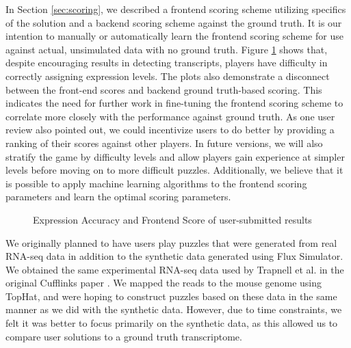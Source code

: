 \documentclass[12pt]{article}
\begin{document}
In Section \ref{sec:scoring}, we described a frontend scoring scheme utilizing specifics of the solution and a backend scoring scheme against the ground truth. It is our intention to manually or automatically learn the frontend scoring scheme for use against actual, unsimulated data with no ground truth. Figure \ref{fig:score} shows that, despite encouraging results in detecting transcripts, players have difficulty in correctly assigning expression levels. The plots also demonstrate a disconnect between the front-end scores and backend ground truth-based scoring. This indicates the need for further work in fine-tuning the frontend scoring scheme to correlate more closely with the performance against ground truth. As one user review also pointed out, we could incentivize users to do better by providing a ranking of their scores against other players. In future versions, we will also stratify the game by difficulty levels and allow players gain experience at simpler levels before moving on to more difficult puzzles. Additionally, we believe that it is possible to apply machine learning algorithms to the frontend scoring parameters and learn the optimal scoring parameters.

\begin{figure}[H]
\centering
{}
\caption{Expression Accuracy and Frontend Score of user-submitted results}\label{fig:score}
\end{figure}

We originally planned to have users play puzzles that were generated from real RNA-seq data in addition to the synthetic data generated using Flux Simulator.
We obtained the same experimental RNA-seq data used by Trapnell et al. in the original Cufflinks paper \citep{trapnell2010transcript}. We mapped the reads to 
the mouse genome using TopHat, and were hoping to construct puzzles based on these data in the same manner as we did with the synthetic data. However, due
to time constraints, we felt it was better to focus primarily on the synthetic data, as this allowed us to compare user solutions to a ground truth transcriptome.
\end{document}
